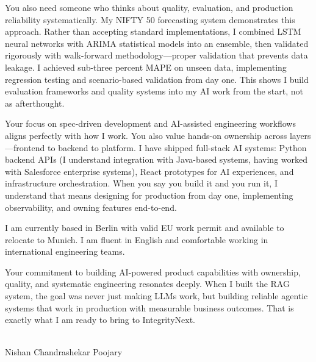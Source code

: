 \documentclass[10pt,a4paper]{article}
\begin{document}
\vspace{0.4cm}

\noindent You also need someone who thinks about quality, evaluation, and production reliability systematically. My NIFTY 50 forecasting system demonstrates this approach. Rather than accepting standard implementations, I combined LSTM neural networks with ARIMA statistical models into an ensemble, then validated rigorously with walk-forward methodology—proper validation that prevents data leakage. I achieved sub-three percent MAPE on unseen data, implementing regression testing and scenario-based validation from day one. This shows I build evaluation frameworks and quality systems into my AI work from the start, not as afterthought.

\vspace{0.4cm}

\noindent Your focus on spec-driven development and AI-assisted engineering workflows aligns perfectly with how I work. You also value hands-on ownership across layers—frontend to backend to platform. I have shipped full-stack AI systems: Python backend APIs (I understand integration with Java-based systems, having worked with Salesforce enterprise systems), React prototypes for AI experiences, and infrastructure orchestration. When you say you build it and you run it, I understand that means designing for production from day one, implementing observability, and owning features end-to-end.

\vspace{0.4cm}

\noindent I am currently based in Berlin with valid EU work permit and available to relocate to Munich. I am fluent in English and comfortable working in international engineering teams.

\vspace{0.4cm}

\noindent Your commitment to building AI-powered product capabilities with ownership, quality, and systematic engineering resonates deeply. When I built the RAG system, the goal was never just making LLMs work, but building reliable agentic systems that work in production with measurable business outcomes. That is exactly what I am ready to bring to IntegrityNext.

\vspace{0.4cm}

 \\
Nishan Chandrashekar Poojary
\end{document}
